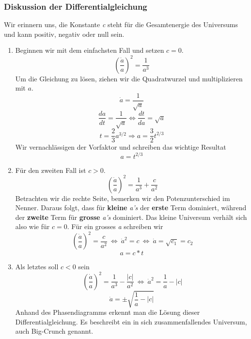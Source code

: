 \begin{refsection}
\subsubsection{Diskussion der Differentialgleichung}
Wir erinnern uns, die Konstante \textit{c} steht für die Gesamtenergie des Universums und kann positiv, negativ oder null sein.
\begin{enumerate}
	\item Beginnen wir mit dem einfachsten Fall und setzen $c = 0$.
	\[\left(\frac{\dot{a}}{a} \right)^2 = \frac{1}{a^3}\]
	Um die Gleichung zu lösen, ziehen wir die Quadratwurzel und multiplizieren mit $a$.
	\[ \dot{a} = \frac{1}{\sqrt{a}} \]
	\[\frac{da}{dt} =\frac{1}{\sqrt{a}} \Leftrightarrow \frac{dt}{da} = \sqrt{a} \]
	\[ t = \frac{2}{3} a^{3/2} \Rightarrow a = \frac{3}{2} t^{2/3} \]
	Wir vernachlässigen der Vorfaktor und schreiben das wichtige Resultat
	\begin{equation}
	a = t^{2/3}
	\end{equation}
	
	\item Für den zweiten Fall ist $c > 0$.
	\[\ \left(\frac{\dot{a}}{a} \right)^2 = \frac{1}{a^3} + \frac{c}{a^2}\]
	Betrachten wir die rechte Seite, bemerken wir den Potenzunterschied im Nenner. Daraus folgt, dass für \textbf{kleine} \textit{a's} der \textbf{erste} Term dominiert, während der \textbf{zweite} Term für \textbf{grosse} \textit{a's} dominiert. Das kleine Universum verhält sich also wie für $c = 0$. Für ein grosses \textit{a} schreiben wir
	\[\ \left(\frac{\dot{a}}{a} \right)^2 = \frac{c}{a^2} \: \Leftrightarrow \:	\dot{a}^2 = c \: \Leftrightarrow \: \dot{a} = \sqrt{c_1} = c_2\]
	\begin{equation}
	a = c*t
	\end{equation}
	
	\item Als letztes soll $c < 0$ sein
	\[\ \left(\frac{\dot{a}}{a} \right)^2 = \frac{1}{a^3} - \frac{|c|}{a^2} \: \Leftrightarrow \: \dot{a}^2 = \frac{1}{a} - |c|\]
	\begin{equation}
	\dot{a} = \pm \sqrt{\frac{1}{a} - |c|}
	\end{equation}
	Anhand des Phasendiagramms erkennt man die Lösung dieser Differentialgleichung. Es beschreibt ein in sich zusammenfallendes Universum, auch Big-Crunch genannt.
	
\end{enumerate}


\end{refsection}
